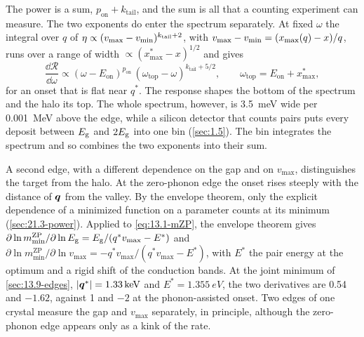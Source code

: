 The power is a sum, $p_{\mathrm{on}} + k_{\mathrm{tail}}$, and the sum is all that a counting experiment can measure. The two exponents do enter the spectrum separately. At fixed $\omega$ the integral over $q$ of $\eta \propto (v_{\mathrm{max}} - v_{\mathrm{min}})^{k_{\mathrm{tail}}+2}$, with $v_{\mathrm{max}} - v_{\mathrm{min}} = (x_{\mathrm{max}}(q) - x)/q$, runs over a range of width $\propto (x_{\mathrm{max}}^* - x)^{1/2}$ and gives
\begin{equation*}
  \frac{\dd\mathcal{R}}{\dd\omega} \propto (\omega - E_{\mathrm{on}})^{p_{\mathrm{on}}}\,(\omega_{\mathrm{top}} - \omega)^{k_{\mathrm{tail}} + 5/2} , \qquad \omega_{\mathrm{top}} = E_{\mathrm{on}} + x_{\mathrm{max}}^* ,
\end{equation*}
for an onset that is flat near $q^*$. The response shapes the bottom of the spectrum and the halo its top. The whole spectrum, however, is \SI{3.5}{meV} wide per \SI{0.001}{MeV} above the edge, while a silicon detector that counts pairs puts every deposit between $E_{\mathrm{g}}$ and $2E_{\mathrm{g}}$ into one bin (\cref{sec:1.5}). The bin integrates the spectrum and so combines the two exponents into their sum.

A second edge, with a different dependence on the gap and on $v_{\mathrm{max}}$, distinguishes the target from the halo. At the zero-phonon edge the onset rises steeply with the distance of $\bm{q}$ from the valley. By the envelope theorem, only the explicit dependence of a minimized function on a parameter counts at its minimum (\cref{sec:21.3-power}). Applied to \cref{eq:13.1-mZP}, the envelope theorem gives $\partial\ln m_{\mathrm{min}}^{\mathrm{ZP}}/\partial\ln E_{\mathrm{g}} = E_{\mathrm{g}}/(q^*v_{\mathrm{max}} - E^*)$ and $\partial\ln m_{\mathrm{min}}^{\mathrm{ZP}}/\partial\ln v_{\mathrm{max}} = -q^*v_{\mathrm{max}}/(q^*v_{\mathrm{max}} - E^*)$, with $E^*$ the pair energy at the optimum and a rigid shift of the conduction bands. At the joint minimum of \cref{sec:13.9-edges}, $|\bm{q}^*| = \SI{1.33}{keV}$ and $E^* = \SI{1.355}{eV}$, the two derivatives are 0.54 and $-1.62$, against 1 and $-2$ at the phonon-assisted onset. Two edges of one crystal measure the gap and $v_{\mathrm{max}}$ separately, in principle, although the zero-phonon edge appears only as a kink of the rate.

